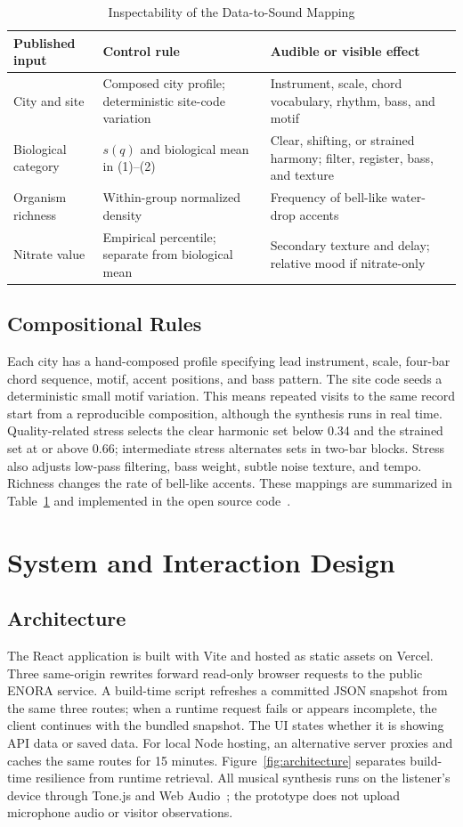 \documentclass[conference]{IEEEtran}
\begin{document}
\begin{table}[t]
\caption{Inspectability of the Data-to-Sound Mapping}
\label{tab:mapping}
\centering
\footnotesize
\begin{tabular}{p{}p{}p{}}
\toprule
Published input & Control rule & Audible or visible effect \\
\midrule
City and site & Composed city profile; deterministic site-code variation & Instrument, scale, chord vocabulary, rhythm, bass, and motif \\
Biological category & $s(q)$ and biological mean in (1)--(2) & Clear, shifting, or strained harmony; filter, register, bass, and texture \\
Organism richness & Within-group normalized density & Frequency of bell-like water-drop accents \\
Nitrate value & Empirical percentile; separate from biological mean & Secondary texture and delay; relative mood if nitrate-only \\
\bottomrule
\end{tabular}
\end{table}

\subsection{Compositional Rules}
Each city has a hand-composed profile specifying lead instrument, scale, four-bar chord sequence, motif, accent positions, and bass pattern. The site code seeds a deterministic small motif variation. This means repeated visits to the same record start from a reproducible composition, although the synthesis runs in real time. Quality-related stress selects the clear harmonic set below 0.34 and the strained set at or above 0.66; intermediate stress alternates sets in two-bar blocks. Stress also adjusts low-pass filtering, bass weight, subtle noise texture, and tempo. Richness changes the rate of bell-like accents. These mappings are summarized in Table~\ref{tab:mapping} and implemented in the open source code~\cite{songsoong-code}.

\section{System and Interaction Design}
\subsection{Architecture}
The React application is built with Vite and hosted as static assets on Vercel. Three same-origin rewrites forward read-only browser requests to the public ENORA service. A build-time script refreshes a committed JSON snapshot from the same three routes; when a runtime request fails or appears incomplete, the client continues with the bundled snapshot. The UI states whether it is showing API data or saved data. For local Node hosting, an alternative server proxies and caches the same routes for 15 minutes. Figure~\ref{fig:architecture} separates build-time resilience from runtime retrieval. All musical synthesis runs on the listener's device through Tone.js and Web Audio~\cite{tonejs}; the prototype does not upload microphone audio or visitor observations.
\end{document}
